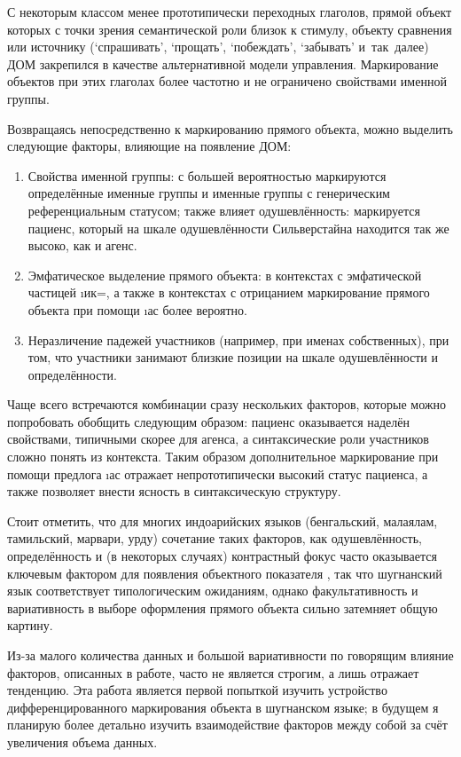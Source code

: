 С некоторым классом менее прототипически переходных глаголов, прямой объект которых с точки зрения семантической роли близок к стимулу, объекту сравнения или источнику (‘спрашивать’, ‘прощать’, ‘побеждать’, ‘забывать’ и~так~далее) ДОМ закрепился в качестве альтернативной модели управления. Маркирование объектов при этих глаголах более частотно и не ограничено свойствами именной группы.

Возвращаясь непосредственно к маркированию прямого объекта, можно выделить следующие факторы, влияющие на появление ДОМ:

\begin{enumerate}
  \item Свойства именной группы: с большей вероятностью маркируются определённые именные группы и именные группы с генерическим референциальным статусом; также влияет одушевлённость: маркируется пациенс, который на шкале одушевлённости Сильверстайна находится так же высоко, как и агенс.
  \item Эмфатическое выделение прямого объекта: в контекстах с эмфатической частицей \i{ик}=, а также в контекстах с отрицанием маркирование прямого объекта при помощи \i{ас} более вероятно.
  \item Неразличение падежей участников (например, при именах собственных), при том, что участники занимают близкие позиции на шкале одушевлённости и определённости.
\end{enumerate}

Чаще всего встречаются комбинации сразу нескольких факторов, которые можно попробовать обобщить следующим образом: пациенс оказывается наделён свойствами, типичными скорее для агенса, а синтаксические роли участников сложно понять из контекста. Таким образом дополнительное маркирование при помощи предлога \i{ас} отражает непрототипически высокий статус пациенса, а также позволяет внести ясность в синтаксическую структуру.

Стоит отметить, что для многих индоарийских языков (бенгальский, малаялам, тамильский, марвари, урду) сочетание таких факторов, как одушевлённость, определённость и (в некоторых случаях) контрастный фокус часто оказывается ключевым фактором для появления объектного показателя \parencite[464]{subbarao2016}, так что шугнанский язык соответствует типологическим ожиданиям, однако факультативность и вариативность в выборе оформления прямого объекта сильно затемняет общую картину.

Из-за малого количества данных и большой вариативности по говорящим влияние факторов, описанных в работе, часто не является строгим, а лишь отражает тенденцию. Эта работа является первой попыткой изучить устройство дифференцированного маркирования объекта в шугнанском языке; в будущем я планирую более детально изучить взаимодействие факторов между собой за счёт увеличения объема данных.
